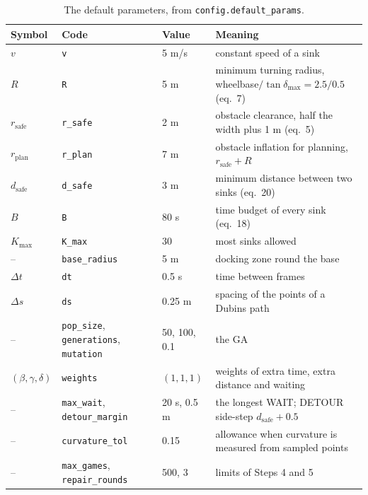 \documentclass[10pt]{article}
\newcommand{\code}[1]{\texttt{#1}}
\newcommand{\rplan}{r_{\mathrm{plan}}}
\newcommand{\rsafe}{r_{\mathrm{safe}}}
\newcommand{\dsafe}{d_{\mathrm{safe}}}
\newcommand{\Kmax}{K_{\max}}
\begin{document}
\begin{table}[H]
\centering\small
\renewcommand{\arraystretch}{1.2}
\begin{tabularx}{\textwidth}{@{}lllL@{}}
\toprule
Symbol & Code & Value & Meaning \\
\midrule
$v$ & \code{v} & 5 m/s & constant speed of a sink \\
$R$ & \code{R} & 5 m & minimum turning radius, wheelbase$/\tan\delta_{\max} = 2.5/0.5$ (eq.~7) \\
$\rsafe$ & \code{r\_safe} & 2 m & obstacle clearance, half the width plus 1 m (eq.~5) \\
$\rplan$ & \code{r\_plan} & 7 m & obstacle inflation for planning, $\rsafe + R$ \\
$\dsafe$ & \code{d\_safe} & 3 m & minimum distance between two sinks (eq.~20) \\
$B$ & \code{B} & 80 s & time budget of every sink (eq.~18) \\
$\Kmax$ & \code{K\_max} & 30 & most sinks allowed \\
-- & \code{base\_radius} & 5 m & docking zone round the base \\
$\Delta t$ & \code{dt} & 0.5 s & time between frames \\
$\Delta s$ & \code{ds} & 0.25 m & spacing of the points of a Dubins path \\
-- & \code{pop\_size}, \code{generations}, \code{mutation} & 50, 100, 0.1 & the GA \\
$(\beta,\gamma,\delta)$ & \code{weights} & $(1, 1, 1)$ & weights of extra time, extra distance and waiting \\
-- & \code{max\_wait}, \code{detour\_margin} & 20 s, 0.5 m & the longest WAIT; DETOUR side-step $\dsafe + 0.5$ \\
-- & \code{curvature\_tol} & 0.15 & allowance when curvature is measured from sampled points \\
-- & \code{max\_games}, \code{repair\_rounds} & 500, 3 & limits of Steps 4 and 5 \\
\bottomrule
\end{tabularx}
\caption{The default parameters, from \code{config.default\_params}.}
\label{tab:params}
\end{table}
\end{document}
